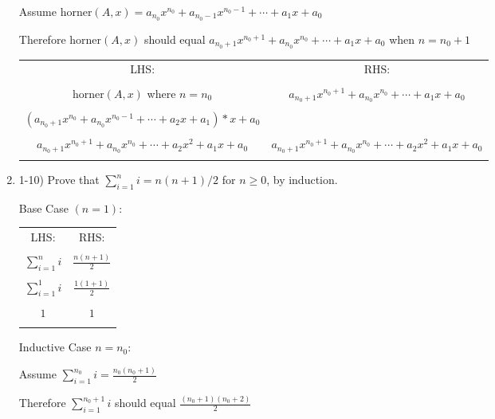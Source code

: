 \documentclass{article}
\begin{document}
\begin{enumerate}
        Assume horner$(A, x) = a_{n_0}x^{n_0} + a_{n_0-1}x^{n_0-1} + \cdots + a_1x + a_0 $

        Therefore horner$(A, x)$ should equal $ a_{n_0+1}x^{n_0+1} + a_{n_0}x^{n_0} + \cdots + a_1x + a_0 $ when $n = n_0 + 1$

    \begin{center}
        \begin{tabular}{ c | c } 
        LHS: & RHS: \\ \\
        horner$(A, x)$ where $n = n_0$ & $ a_{n_0+1}x^{n_0+1} + a_{n_0}x^{n_0} + \cdots + a_1x + a_0 $ \\ \\
        $ (a_{n_0+1}x^{n_0} + a_{n_0}x^{n_0 - 1} + \cdots + a_2x + a_1)*x+a_0 $ & \\ \\
        $ \boxed{a_{n_0+1}x^{n_0 + 1} + a_{n_0}x^{n_0} + \cdots + a_2x^2 + a_1x + a_0} $  & $\boxed{a_{n_0+1}x^{n_0 + 1} + a_{n_0}x^{n_0} + \cdots + a_2x^2 + a_1x + a_0}$ \\ \\
        \end{tabular}
    \end{center}
    
    \item 1-10) Prove that $\sum_{i=1}^{n}i=n(n+1)/2 $ for $n \ge 0 $, by induction.
    
    Base Case $(n = 1)$:
    \begin{center}
        \begin{tabular}{ c | c } 
        LHS: & RHS: \\ & \\
        $ \sum_{i=1}^{n} i $ & $ \frac{n(n+1)}{2}$ \\ \\
        $ \sum_{i=1}^{1} i $ & $ \frac{1(1+1)}{2}$ \\ \\
        $ 1 $ & $ 1 $ \\ \\
        \end{tabular}
    \end{center}
    Inductive Case $ n = n_0 $:
    
        Assume $ \sum_{i=1}^{n_0} i = \frac{n_0(n_0+1)}{2} $

        Therefore $ \sum_{i=1}^{n_0+1} i $ should equal $ \frac{(n_0+1)(n_0+2)}{2} $


\end{enumerate}
\end{document}
